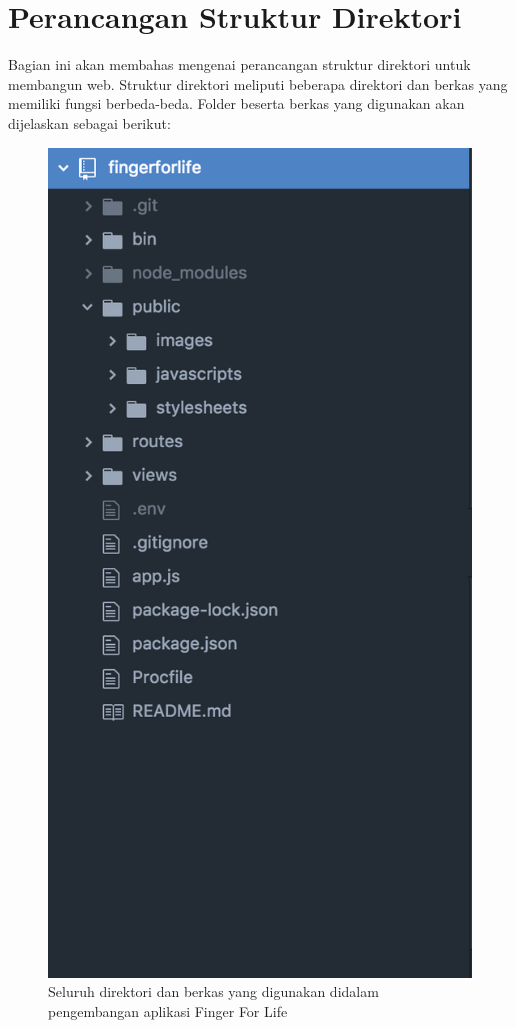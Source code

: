 \section{Perancangan Struktur Direktori}

Bagian ini akan membahas mengenai perancangan struktur direktori untuk membangun web. Struktur direktori meliputi beberapa direktori dan berkas yang memiliki fungsi berbeda-beda. Folder beserta berkas yang digunakan akan dijelaskan sebagai berikut:

\begin{figure}[H]
	\centering
	\includegraphics[scale=0.4]{Gambar/direktori}
	\caption{Seluruh direktori dan berkas yang digunakan didalam pengembangan aplikasi Finger For Life}
	\label{fig:direktori}
\end{figure}

